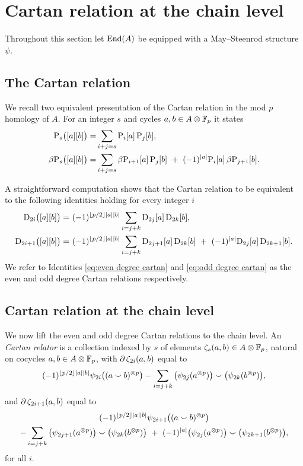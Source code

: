 
\section{Cartan relation at the chain level}\label{s:cartan}

Throughout this section let $\mathrm{End}(A)$ be equipped with a May--Steenrod structure~$\psi$.

\subsection{The Cartan relation}

We recall two equivalent presentation of the Cartan relation in the mod $p$ homology of $A$.
For an integer $s$ and cycles $a, b \in A \otimes {\mathbb{F}_p}$ it states
\begin{align*}
	\mathrm{P}_s\big([a][b]\big) =&
	\sum_{i+j=s} \mathrm{P}_i[a] \, \mathrm{P}_j[b], \\
	\beta\mathrm{P}_s\big([a][b]\big) =&
	\sum_{i+j=s} \beta\mathrm{P}_{i+1}[a] \, \mathrm{P}_j[b] \ +\ (-1)^{\lvert a\rvert} \mathrm{P}_i[a] \, \beta\mathrm{P}_{j+1}[b].
\end{align*}

A straightforward computation shows that the Cartan relation to be equivalent to the following identities holding for every integer $i$
\begin{align}
	\label{eq:even degree cartan}
	\mathrm{D}_{2i}\big([a][b]\big) =\ &
	(-1)^{\lfloor p/2\rfloor\lvert a\rvert\lvert b\rvert} \sum_{i=j+k} \mathrm{D}_{2j}[a] \, \mathrm{D}_{2k}[b], \\
	\label{eq:odd degree cartan}
	\mathrm{D}_{2i+1}\big([a][b]\big) =\ &
	(-1)^{\lfloor p/2\rfloor\lvert a\rvert\lvert b\rvert} \sum_{i=j+k} \mathrm{D}_{2j+1}[a] \, \mathrm{D}_{2k}[b] \ +\ (-1)^{\lvert a\rvert}\mathrm{D}_{2j}[a] \, \mathrm{D}_{2k+1}[b].
\end{align}
We refer to Identities \eqref{eq:even degree cartan} and \eqref{eq:odd degree cartan} as the even and odd degree Cartan relations respectively.

\subsection{Cartan relation at the chain level}

We now lift the even and odd degree Cartan relations to the chain level.
An \textit{Cartan relator} is a collection indexed by $s$ of elements $\zeta_{s}(a,b) \in A \otimes {\mathbb{F}_p}$, natural on cocycles $a,b \in A \otimes {\mathbb{F}_p}$, with $\operatorname{\partial}\zeta_{2i}(a,b)$ equal to
\begin{align*}
	(-1)^{\lfloor p/2\rfloor\lvert a\rvert\lvert b\rvert} \psi_{2i}\big((a \smallsmile b)^{\otimes p}\big) -
	\sum_{i=j+k}\big(\psi_{2j}(a^{\otimes p})\big) \smallsmile \big(\psi_{2k}(b^{\otimes p})\big),
\end{align*}
and $\operatorname{\partial} \zeta_{2i+1}(a,b)$ equal to
\begin{multline*}
	(-1)^{\lfloor p/2\rfloor\lvert a\rvert\lvert b\rvert} \psi_{2i+1}\big((a \smallsmile b)^{\otimes p}\big)\\ -
	\sum_{i=j+k} \big(\psi_{2j+1}(a^{\otimes p})\big) \smallsmile \big(\psi_{2k}(b^{\otimes p})\big)\ +\
	(-1)^{\lvert a\rvert}\big(\psi_{2j}(a^{\otimes p})\big) \smallsmile \big(\psi_{2k+1}(b^{\otimes p})\big),
\end{multline*}
for all $i$.

